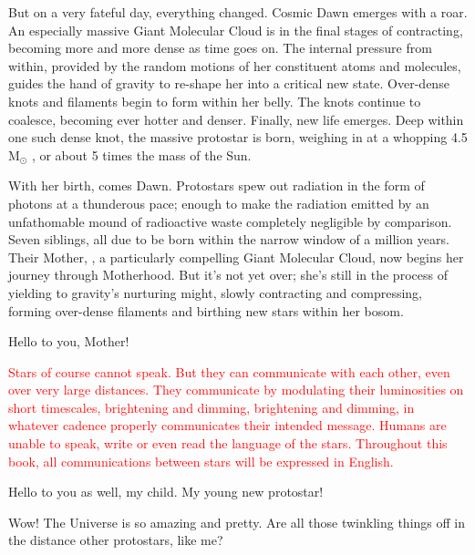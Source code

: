 \documentclass[main.tex]{subfiles}
\begin{document}
\par \nar But on a very fateful day, everything changed.  Cosmic Dawn emerges with a roar.  An especially massive Giant Molecular Cloud is in the final stages of contracting, becoming more and more dense as time goes on.  The internal pressure from within, provided by the random motions of her constituent atoms and molecules, guides the hand of gravity to re-shape her into a critical new state.  Over-dense knots and filaments begin to form within her belly.  The knots continue to coalesce, becoming ever hotter and denser.  Finally, new life emerges.  Deep within one such dense knot, the massive protostar \rmmaia is born, weighing in at a whopping 4.5 M$_{\odot}$ , or about 5 times the mass of the Sun.

\par \nar With her birth, comes Dawn.  Protostars spew out radiation in the form of photons at a thunderous pace; enough to make the radiation emitted by an unfathomable mound of radioactive waste completely negligible by comparison.  Seven siblings, all due to be born within the narrow window of a million years. Their Mother, \rmpleione, a particularly compelling Giant Molecular Cloud, now begins her journey through Motherhood.  But it's not yet over; she's still in the process of yielding to gravity's nurturing might, slowly contracting and compressing, forming over-dense filaments and birthing new stars within her bosom.  

\par \Maia Hello to you, Mother!

\begin{tcolorbox}[sharp corners, colback=red!30, colframe=red!80!blue, title=Stellar Communication]
\par \textcolor{red} {Stars of course cannot speak.  But they can communicate with each other, even over very large distances.  They communicate by modulating their luminosities on short timescales, brightening and dimming, brightening and dimming, in whatever cadence properly communicates their intended message.  Humans are unable to speak, write or even read the language of the stars.  Throughout this book, all communications between stars will be expressed in English.} 
\end{tcolorbox}

\par \Pleione Hello to you as well, my child.  My young new protostar!

\par \Maia Wow!  The Universe is so amazing and pretty.  Are all those twinkling things off in the distance other protostars, like me?
\end{document}
